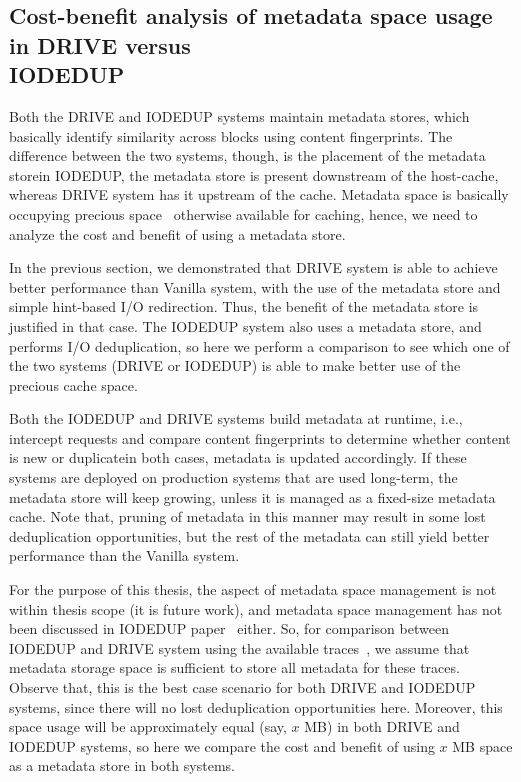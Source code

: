 %

\subsection{Cost-benefit analysis of metadata space usage in DRIVE versus \\IODEDUP}
Both the DRIVE and IODEDUP systems maintain metadata stores, which 
basically identify similarity across blocks using content fingerprints.
The difference between the two systems, though, is the placement of
the metadata store\textemdash{}in IODEDUP, the metadata store is present downstream
of the host-cache, whereas DRIVE system has it upstream of the cache.
Metadata space is basically occupying precious space~\cite{idedup} otherwise 
available for caching, hence, we need to analyze the cost
and benefit of using a metadata store. 

In the previous section, we demonstrated that DRIVE system is able
to achieve better performance than Vanilla system, with the use of the
metadata store and simple hint-based I/O redirection. Thus, the benefit
of the metadata store is justified in that case.
The IODEDUP system also uses a metadata store, and performs I/O
deduplication, so here we perform a comparison to see which one
of the two systems (DRIVE or IODEDUP) is able to make better use
of the precious cache space. 

Both the IODEDUP and DRIVE systems build metadata at runtime, i.e.,
intercept requests and compare content fingerprints to determine
whether content is new or duplicate\textemdash{}in both cases, metadata 
is updated accordingly. If these systems are deployed on 
production systems that are used long-term, the metadata store
will keep growing, unless it is managed as a fixed-size metadata cache.
Note that, pruning of metadata in this manner may result in some
lost deduplication opportunities, but the rest of the metadata
can still yield better performance than the Vanilla system.

For the purpose of this thesis, the aspect of metadata space 
management is not within thesis scope (it is future work), and
metadata space management has not been discussed in 
IODEDUP paper~\cite{iodedup} either.
So, for comparison between IODEDUP and DRIVE system using the 
available traces~\cite{iodedup-online}, we assume
that metadata storage space is sufficient to store all metadata
for these traces.
Observe that, this is
the best case scenario for both DRIVE and IODEDUP systems,
since there will no lost deduplication opportunities here.
Moreover, this space usage will be approximately equal (say, $x$ MB)
in both DRIVE and IODEDUP systems, so here we compare the cost and 
benefit of using $x$ MB space as a metadata store in both systems.

